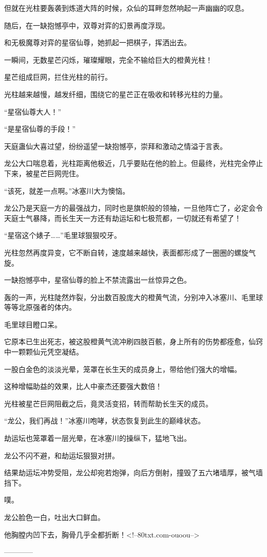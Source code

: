 \begin{this_body}
但就在光柱要轰袭到炼道大阵的时候，众仙的耳畔忽然响起一声幽幽的叹息。

随后，在一缺抱憾亭中，双尊对弈的幻景再度浮现。

和无极魔尊对弈的星宿仙尊，她抓起一把棋子，挥洒出去。

一瞬间，无数星芒闪烁，璀璨耀眼，完全不输给巨大的橙黄光柱！

星芒组成巨网，拦住光柱的前行。

光柱越来越慢，越发纤细，围绕它的星芒正在吸收和转移光柱的力量。

“星宿仙尊大人！”

“是星宿仙尊的手段！”

天庭蛊仙大喜过望，纷纷遥望一缺抱憾亭，崇拜和激动之情溢于言表。

龙公大口喘息着，光柱距离他极近，几乎要贴在他的脸上。但最终，光柱完全停止下来，被星芒巨网兜住。

“该死，就差一点啊。”冰塞川大为懊恼。

龙公乃是天庭一方的最强战力，同时也是旗帜般的领袖，一旦他阵亡了，必定会令天庭士气暴降，而长生天一方还有劫运坛和七极荒都，一切就还有希望了！

“星宿这个婊子……”毛里球狠狠咬牙。

光柱忽然再度异变，它不断自转，速度越来越快，表面都形成了一圈圈的螺旋气旋。

一缺抱憾亭中，星宿仙尊的脸上不禁流露出一丝惊异之色。

轰的一声，光柱陡然炸裂，分出数百股庞大的橙黄气流，分别冲入冰塞川、毛里球等等北原强者的体内。

毛里球目瞪口呆。

它原本已生出死志，被这股橙黄气流冲刷四肢百骸，身上所有的伤势都痊愈，仙窍中一颗颗仙元凭空凝结。

一股白金色的淡淡光晕，笼罩在长生天的成员身上，带给他们强大的增幅。

这种增幅助益的效果，比人中豪杰还要强大数倍！

光柱被星芒巨网阻截之后，竟灵活变招，转而帮助长生天的成员。

“龙公，我们再战！”冰塞川咆哮，状态恢复到此生的巅峰状态。

劫运坛也笼罩着一层光晕，在冰塞川的操纵下，猛地飞出。

龙公不闪不避，和劫运坛狠狠对拼。

结果劫运坛冲势受阻，龙公却宛若炮弹，向后方倒射，撞毁了五六堵墙厚，被气墙挡下。

噗。

龙公脸色一白，吐出大口鲜血。

他胸膛内凹下去，胸骨几乎全都折断！<!--80txt.com-ouoou-->

------------

\end{this_body}


